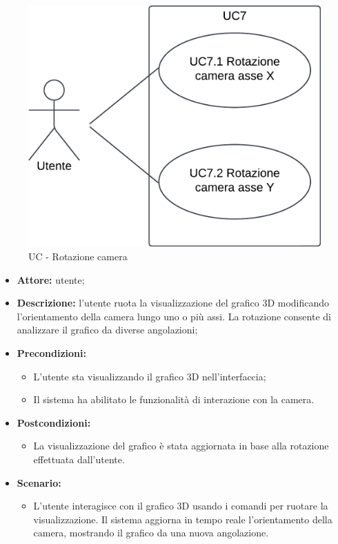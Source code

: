 \begin{figure}[h!]
    \centering
    \includegraphics[scale=0.7]{template/images/UC7_7.1_7.2.png}
    \caption{UC - Rotazione camera}
\end{figure}
\begin{itemize}
    \item \textbf{Attore:} utente;
    \item \textbf{Descrizione:} l'utente ruota la visualizzazione del grafico 3D modificando l'orientamento della camera lungo uno o più assi. La rotazione consente di analizzare il grafico da diverse angolazioni;
    \item \textbf{Precondizioni:} 
    \begin{itemize}
        \item L'utente sta visualizzando il grafico 3D nell'interfaccia;
        \item Il sistema ha abilitato le funzionalità di interazione con la camera.
    \end{itemize}
    \item \textbf{Postcondizioni:} 
    \begin{itemize}
        \item La visualizzazione del grafico è stata aggiornata in base alla rotazione effettuata dall'utente.
    \end{itemize}
    \item \textbf{Scenario:} 
    \begin{itemize}
        \item L'utente interagisce con il grafico 3D usando i comandi per ruotare la visualizzazione. Il sistema aggiorna in tempo reale l'orientamento della camera, mostrando il grafico da una nuova angolazione.
    \end{itemize}
    
\end{itemize}
